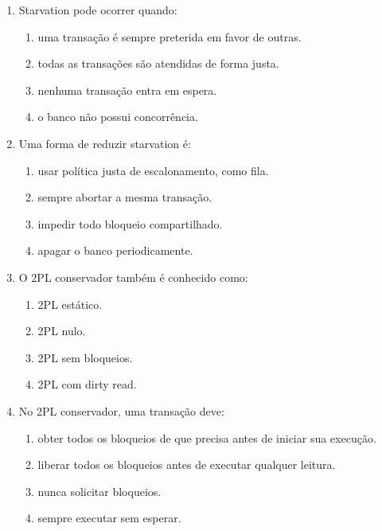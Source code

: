 \documentclass[12pt,a4paper]{article}
\begin{document}
\begin{enumerate}[label=\textbf{Q\arabic*.}]
\begin{enumerate}[label=\alph*)]
    \item uma transação espera indefinidamente e nunca consegue prosseguir.
    \item uma transação confirma rapidamente.
    \item uma transação não precisa de nenhum bloqueio.
    \item duas transações leem o mesmo item simultaneamente.
\end{enumerate}

\item Starvation pode ocorrer quando:

\begin{enumerate}[label=\alph*)]
    \item uma transação é sempre preterida em favor de outras.
    \item todas as transações são atendidas de forma justa.
    \item nenhuma transação entra em espera.
    \item o banco não possui concorrência.
\end{enumerate}

\item Uma forma de reduzir starvation é:

\begin{enumerate}[label=\alph*)]
    \item usar política justa de escalonamento, como fila.
    \item sempre abortar a mesma transação.
    \item impedir todo bloqueio compartilhado.
    \item apagar o banco periodicamente.
\end{enumerate}

\item O 2PL conservador também é conhecido como:

\begin{enumerate}[label=\alph*)]
    \item 2PL estático.
    \item 2PL nulo.
    \item 2PL sem bloqueios.
    \item 2PL com dirty read.
\end{enumerate}

\item No 2PL conservador, uma transação deve:

\begin{enumerate}[label=\alph*)]
    \item obter todos os bloqueios de que precisa antes de iniciar sua execução.
    \item liberar todos os bloqueios antes de executar qualquer leitura.
    \item nunca solicitar bloqueios.
    \item sempre executar sem esperar.
\end{enumerate}


\end{enumerate}
\end{document}
